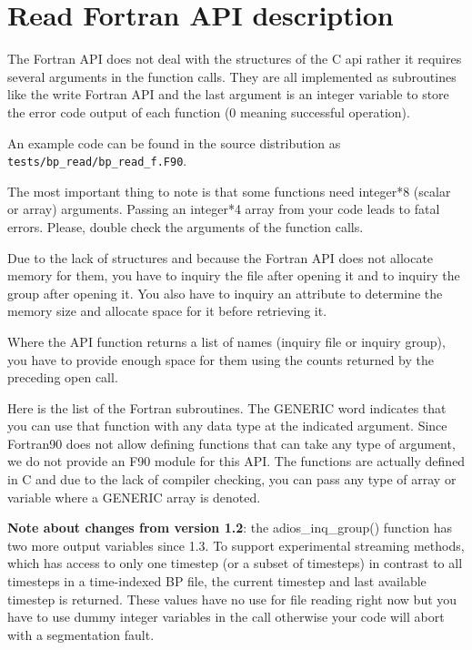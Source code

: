 \section{Read Fortran API description}
\label{section:read_fortran_api}

The Fortran API does not deal with the structures of the C api rather it requires 
several arguments in the function calls.  They are all implemented as subroutines 
like the write Fortran API and the last argument is an integer variable to store 
the error code output of each function (0 meaning successful operation). 

An example code can be found in the source distribution as 
\verb+tests/bp_read/bp_read_f.F90+.

The most important thing to note is that some functions need integer*8 (scalar 
or array) arguments. Passing an integer*4 array from your code leads to fatal errors. 
Please, double check the arguments of the function calls. 

Due to the lack of structures and because the Fortran API does not allocate memory 
for them, you have to inquiry the file after opening it and to inquiry the group 
after opening it. You also have to inquiry an attribute to determine the memory 
size and allocate space for it before retrieving it. 

Where the API function returns a list of names (inquiry file or inquiry group), 
you have to provide enough space for them using the counts returned by the preceding 
open call. 

Here is the list of the Fortran subroutines. The GENERIC word indicates that you 
can use that function with any data type at the indicated argument. Since Fortran90 
does not allow defining functions that can take any type of argument, we do not 
provide an F90 module for this API. The functions are actually defined in C and 
due to the lack of compiler checking, you can pass any type of array or variable 
where a GENERIC array is denoted. 

\textbf{Note about changes from version 1.2}: the adios\_inq\_group() function 
has two more output variables since 1.3. To support experimental streaming methods, 
which has access to only one timestep (or a subset of timesteps) in contrast to 
all timesteps in a time-indexed BP file, the current timestep and last available 
timestep is returned. These values have no use for file reading right now but you 
have to use dummy integer variables in the call otherwise your code will abort 
with a segmentation fault. 

